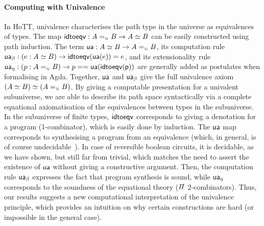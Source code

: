 \paragraph{Computing with Univalence} In HoTT, univalence characterises the path type in the universe as equivalences of
types. The map $\term{idtoeqv} : A \id_{\UU} B \to A \eqv B$ can be easily constructed using path induction. The term
$\term{ua} : A \eqv B \to A \id_{\UU} B$, its computation rule $\term{ua_\beta} : (e : A \eqv B) \to
    \term{idtoeqv}(\term{ua}(e)) \id e$, and its extensionality rule $\term{ua_\eta} : (p : A \id_{\UU} B) \to p ==
    \term{ua}(\term{idtoeqv(p)})$ are generally added as postulates when formalising in Agda. Together, $\operatorname{\mathsf{ua}}$ and
$\operatorname{\mathsf{ua}}_\beta$ give the full univalence axiom $(A \eqv B) \eqv (A \id_{\UU} B)$.
By giving a computable presentation for a univalent subuniverse, we are able to describe its path space syntactically
via a complete equational axiomatisation of the equivalences between types in the subuniverse.
In the subuniverse of finite types, $\operatorname{\mathsf{idtoeqv}}$ corresponds to giving a denotation for a program (1-combinator),
which is easily done by induction.  The $\operatorname{\mathsf{ua}}$ map corresponds to synthesising a program from an equivalence
(which, in general, is of course undecidable~\cite{krogmeierDecidableSynthesisPrograms2020}). In case of reversible
boolean circuits, it is decidable, as we have shown, but still far from trivial, which matches the need to assert the
existence of $\operatorname{\mathsf{ua}}$ without giving a constructive argument. Then, the computation rule $\operatorname{\mathsf{ua_\beta}}$ expresses
the fact that program synthesis is sound, while $\operatorname{\mathsf{ua_\eta}}$ corresponds to the soundness of the equational theory
($\mathit{\Pi}$ 2-combinators). Thus, our results suggests a new computational interpretation of the univalence principle, which
provides an intuition on why certain constructions are hard (or impossible in the general case).



